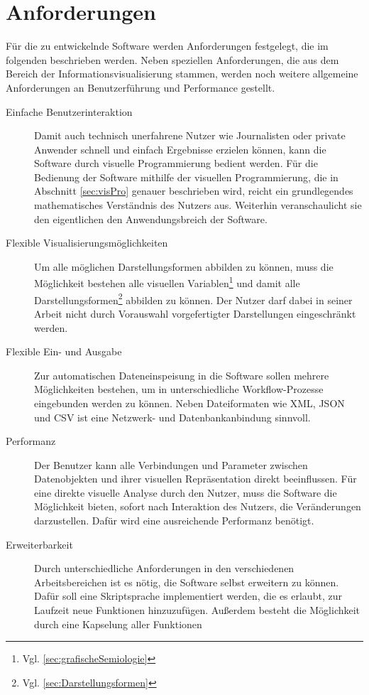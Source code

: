 \documentclass[a4paper, 12pt, DIV=calc, version=first, pdftex, headsepline, footsepline, bibtotocnumbered, liststotocnumbered]{scrreprt}
\begin{document}
\section{Anforderungen}
\label{sec:Anforderungen}
Für die zu entwickelnde Software werden Anforderungen festgelegt, die
im folgenden beschrieben werden. Neben speziellen Anforderungen, die aus
dem Bereich der Informationsvisualisierung stammen, werden noch weitere
allgemeine Anforderungen an Benutzerführung und Performance gestellt.
\begin{description}
\item[Einfache Benutzerinteraktion]
Damit auch technisch unerfahrene Nutzer wie Journalisten oder private
Anwender schnell und einfach Ergebnisse erzielen können, kann die Software
durch visuelle Programmierung bedient werden. Für die Bedienung der Software mithilfe der visuellen
Programmierung, die in Abschnitt \ref{sec:visPro} genauer beschrieben wird,
reicht ein grundlegendes mathematisches Verständnis des Nutzers aus.
Weiterhin veranschaulicht sie den eigentlichen den Anwendungsbreich der Software.
\item[Flexible Visualisierungsmöglichkeiten]
Um alle möglichen Darstellungsformen abbilden zu können, muss die 
Möglichkeit bestehen alle visuellen Variablen\footnote{Vgl.
\ref{sec:grafischeSemiologie}} und damit alle Darstellungsformen\footnote{Vgl.
\ref{sec:Darstellungsformen}} abbilden zu können. Der Nutzer darf dabei
in seiner Arbeit nicht durch Vorauswahl vorgefertigter Darstellungen
eingeschränkt werden.
\item[Flexible Ein- und Ausgabe]
Zur automatischen Dateneinspeisung in die Software sollen mehrere Möglichkeiten
bestehen, um in unterschiedliche Workflow-Prozesse eingebunden werden zu können.
Neben Dateiformaten wie XML, JSON und CSV ist eine Netzwerk- und
Datenbankanbindung sinnvoll.
\item[Performanz]
Der Benutzer kann alle Verbindungen und Parameter zwischen Datenobjekten und ihrer
visuellen Repräsentation direkt beeinflussen. Für eine direkte visuelle Analyse
durch den Nutzer, muss die Software die Möglichkeit bieten, sofort
nach Interaktion des Nutzers, die Veränderungen darzustellen. Dafür wird eine
ausreichende Performanz benötigt.
\item[Erweiterbarkeit]
Durch unterschiedliche Anforderungen in den verschiedenen Arbeitsbereichen ist
es nötig, die Software selbst erweitern zu können. Dafür soll eine Skriptsprache
implementiert werden, die es erlaubt, zur Laufzeit neue Funktionen hinzuzufügen.
Außerdem besteht die Möglichkeit durch eine Kapselung aller Funktionen

\end{description}
\end{document}
